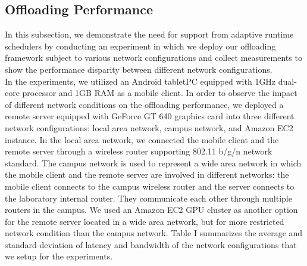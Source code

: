 \documentclass[10pt, conference, compsocconf]{IEEEtran}
\begin{document}
\subsection{Offloading Performance}
In this subsection, we demonstrate the need for support from
adaptive runtime schedulers by conducting an experiment in which we
deploy our offloading framework subject to various network
configurations and collect measurements to show the performance
disparity between different network configurations.\\
%
\indent In the experiments, we utilized an Android tabletPC equipped with
1GHz dual-core processor and 1GB RAM as a mobile client.
%
In order to observe the impact of different network
conditions on the offloading performance, we deployed a remote server
equipped with GeForce GT 640 graphics card into three different network
configurations: local area network, campus network, and Amazon EC2
instance.
%
In the local area network, we connected the mobile client and the remote
server through a wireless router supporting 802.11 b/g/n network
standard.
%
The campus network is used to represent a wide area network in which
the mobile client and the remote server are involved in different
networks: the mobile client connects to the campus wireless router and
the server connects to the laboratory internal router.
%
They communicate each other through multiple routers in the campus.
%
We used an Amazon EC2 GPU cluster as another option for the remote
server located in a wide area network, but for more restricted network
condition than the campus network.
%
Table I summarizes the average and standard deviation of latency
and bandwidth of the network configurations that we setup for the
experiments.\\
%
%
\end{document}
